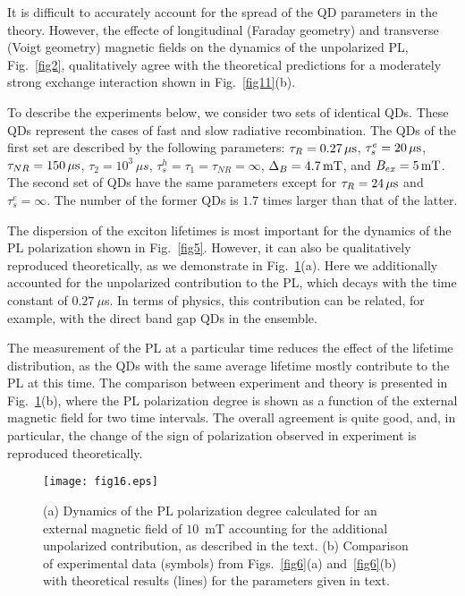 \documentclass[twocolumn,showpacs,preprintnumbers,amsmath,amssymb,aps]{revtex4-1}
\begin{document}
It is difficult to accurately account for the spread of the QD
parameters in the theory. However, the effecte of longitudinal
(Faraday geometry) and transverse (Voigt geometry) magnetic fields
on the dynamics of the unpolarized PL, Fig.~\ref{fig2},
qualitatively agree with the theoretical predictions for a
moderately strong exchange interaction shown in Fig.~\ref{fig11}(b).

To describe the experiments below, we consider two sets
of identical QDs. These QDs represent the cases of fast and slow
radiative recombination. The QDs of the first set are described by
the following parameters: $\tau_R = 0.27 \, \mu {\rm s}$, $\tau_s^e
= 20 \, \mu {\rm s}$, $\tau_{NR} = 150\,\mu{\rm s} $,
$\tau_2=10^3\,\mu s$, $\tau_s^h=\tau_1=\tau_{NR} = \infty$,
$\Delta_B = 4.7\, {\rm mT}$, and $B_{ex} = 5 \,{\rm mT}$. The second set
of QDs have the same parameters except for $\tau_R = 24\, \mu{\rm
s}$ and $\tau_s^e = \infty$. The number of the former QDs is $1.7$
times larger than that of the latter.

The dispersion of the exciton lifetimes is most important for the
dynamics of the PL polarization shown in Fig.~\ref{fig5}. However,
it can also be qualitatively reproduced theoretically, as we
demonstrate in Fig.~\ref{fig16}(a). Here we additionally accounted
for the unpolarized contribution to the PL, which decays with the
time constant of $0.27~\mu$s. In terms of physics, this contribution
can be related, for example, with the direct band gap QDs in the
ensemble.

The measurement of the PL at a particular time reduces the effect of
the lifetime distribution, as the QDs with the same average lifetime
mostly contribute to the PL at this time. The comparison between
experiment and theory is presented in Fig.~\ref{fig16}(b), where the
PL polarization degree is shown as a function of the external
magnetic field for two time intervals. The overall agreement is
quite good, and, in particular, the change of the sign of
polarization observed in experiment is reproduced theoretically.

\begin{figure}[t]
\centering
\texttt{[image: fig16.eps]}
\caption{(a) Dynamics of the PL polarization degree calculated for
an external magnetic field of $10$~mT accounting for the additional
unpolarized contribution, as described in the text. (b) Comparison
of experimental data (symbols) from Figs.~\ref{fig6}(a)
and~\ref{fig6}(b) with theoretical results (lines) for the
parameters given in  text. } \label{fig16}
\end{figure}
\end{document}
